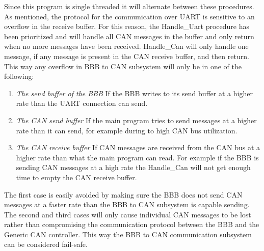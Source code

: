 Since this program is single threaded it will alternate between these procedures. \newline 
As mentioned, the protocol for the communication over UART is sensitive to an overflow in the receive buffer. For this reason, the Handle\_Uart procedure has been prioritized and will handle all CAN messages in the buffer and only return when no more messages have been received. Handle\_Can will only handle one message, if any message is present in the CAN receive buffer, and then return. \newline
This way any overflow in BBB to CAN subsystem will only be in one of the following:

\begin{enumerate}
   \item { \em The send buffer of the BBB} \newline
   If the BBB writes to its send buffer at a higher rate than the UART connection can send.
   \item { \em The CAN send buffer} \newline
   If the main program tries to send messages at a higher rate than it can send, for example during to high CAN bus utilization.
   \item { \em The CAN receive buffer} \newline
   If CAN messages are received from the CAN bus at a higher rate than what the main program can read. For example if the BBB is sending CAN messages at a high rate the Handle\_Can will not get enough time to empty the CAN receive buffer.
\end{enumerate}

The first case is easily avoided by making sure the BBB does not send CAN messages at a faster rate than the BBB to CAN subsystem is capable sending. The second and third cases will only cause individual CAN messages to be lost rather than compromising the communication protocol between the BBB and the Generic CAN controller. \newline
This way the BBB to CAN communication subsystem can be considered fail-safe.